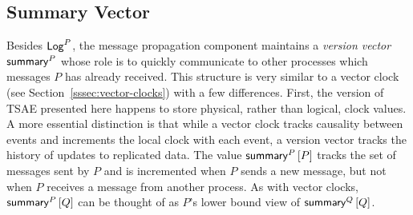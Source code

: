 \documentclass[]             %
{NASA}                       %
\theoremstyle{definition}
\begin{document}
\subsection{Summary Vector}
\label{ssec:tsae-summary-vectors}
Besides $\mathsf{Log}^{P}$, the message propagation component maintains a
\emph{version vector} $\mathsf{summary}^{P}$ whose role is to quickly
communicate to other processes which messages $P$ has already
received. This structure is very similar to a vector clock (see
Section~\ref{sssec:vector-clocks}) with a few differences. First, the
version of TSAE presented here happens to store physical, rather than
logical, clock values. A more essential distinction is that while a
vector clock tracks causality between events and increments the local
clock with each event, a version vector tracks the history of updates
to replicated data. The value $\mathsf{summary}^{P}\left[P\right]$ tracks the set of
messages sent by $P$ and is incremented when $P$ sends a new message,
but not when $P$ receives a message from another process. As with
vector clocks, $\mathsf{summary}^{P}\left[Q\right]$ can be thought of as $P$'s lower bound
view of $\mathsf{summary}^{Q}\left[Q\right]$.
\end{document}
